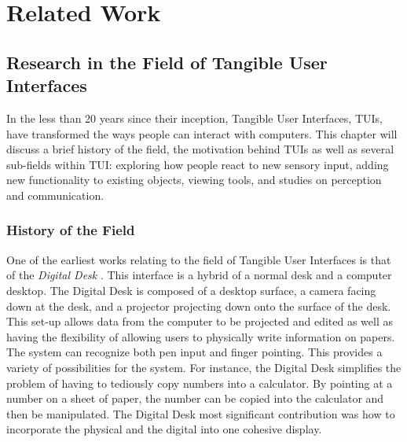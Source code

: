 
\chapter{Related Work}
\section{Research in the Field of Tangible User Interfaces}

In the less than 20 years since their inception, Tangible User Interfaces, TUIs, have transformed the ways people can interact with computers.  This chapter will discuss a brief history of the field, the motivation behind TUIs as well as several sub-fields within TUI: exploring how people react to new sensory input, adding new functionality to existing objects, viewing tools, and studies on perception and communication.
\subsection{History of the Field}

One of the earliest works relating to the field of Tangible User Interfaces is that of the \emph{Digital Desk} \cite{159630}.  This interface is a hybrid of a normal desk and a computer desktop.  The Digital Desk is composed of a desktop surface, a camera facing down at the desk, and a projector projecting down onto the surface of the desk.  This set-up allows data from the computer to be projected and edited as well as having the flexibility of allowing users to physically write information on papers.  The system can recognize both pen input and finger pointing.  This provides a variety of possibilities for the system.  For instance, the Digital Desk simplifies the problem of having to tediously copy numbers into a calculator.  By pointing at a number on a sheet of paper, the number can be copied into the calculator and then be manipulated.  The Digital Desk most significant contribution was how to incorporate the physical and the digital into one cohesive display.

